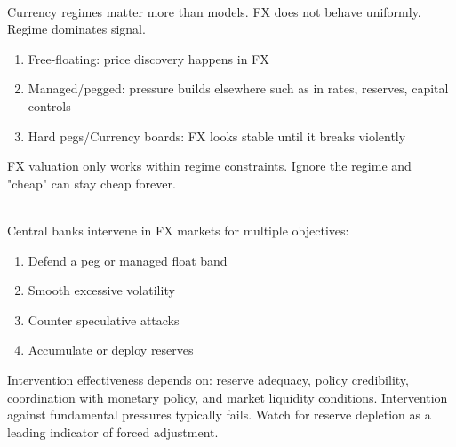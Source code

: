 \documentclass[a4paper,oneside,openany]{book}
\begin{document}
\begin{remark} \\
Currency regimes matter more than models. FX does not behave uniformly. Regime dominates signal.
\begin{enumerate}[label=\roman*.]
\setlength{\itemsep}{0pt}
\item Free-floating: price discovery happens in FX
\item Managed/pegged: pressure builds elsewhere such as in rates, reserves, capital controls
\item Hard pegs/Currency boards: FX looks stable until it breaks violently
\end{enumerate}
FX valuation only works within regime constraints. Ignore the regime and "cheap" can stay cheap forever.
\end{remark}

\begin{remark} \\
Central banks intervene in FX markets for multiple objectives:
\begin{enumerate}[label=\roman*.]
\setlength{\itemsep}{0pt}
\item Defend a peg or managed float band
\item Smooth excessive volatility
\item Counter speculative attacks
\item Accumulate or deploy reserves
\end{enumerate}
Intervention effectiveness depends on: reserve adequacy, policy credibility, coordination with monetary policy, and market liquidity conditions. Intervention against fundamental pressures typically fails. Watch for reserve depletion as a leading indicator of forced adjustment.
\end{remark}
\end{document}
